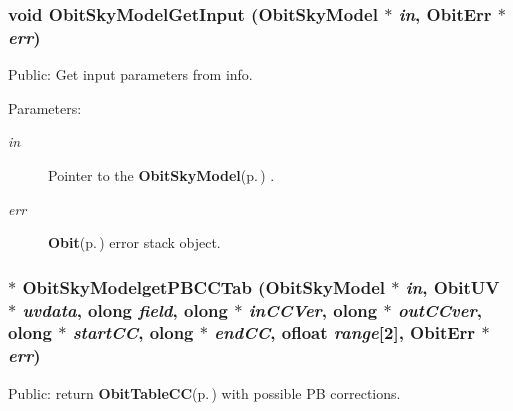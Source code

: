 \subsubsection{\setlength{\rightskip}{0pt plus 5cm}void Obit\-Sky\-Model\-Get\-Input ({\bf Obit\-Sky\-Model} $\ast$ {\em in}, {\bf Obit\-Err} $\ast$ {\em err})}\label{ObitSkyModel_8c_a32}


Public: Get input parameters from info. 

\begin{Desc}
\item[Parameters:]
\begin{description}
\item[{\em in}]Pointer to the {\bf Obit\-Sky\-Model}{\rm (p.\,\pageref{structObitSkyModel})} . \item[{\em err}]{\bf Obit}{\rm (p.\,\pageref{structObit})} error stack object. \end{description}
\end{Desc}
\subsubsection{$\ast$ Obit\-Sky\-Modelget\-PBCCTab ({\bf Obit\-Sky\-Model} $\ast$ {\em in}, {\bf Obit\-UV} $\ast$ {\em uvdata}, {\bf olong} {\em field}, {\bf olong} $\ast$ {\em in\-CCVer}, {\bf olong} $\ast$ {\em out\-CCver}, {\bf olong} $\ast$ {\em start\-CC}, {\bf olong} $\ast$ {\em end\-CC}, {\bf ofloat} {\em range}[2], {\bf Obit\-Err} $\ast$ {\em err})}\label{ObitSkyModel_8c_a36}


Public: return {\bf Obit\-Table\-CC}{\rm (p.\,\pageref{structObitTableCC})} with possible PB corrections. 

